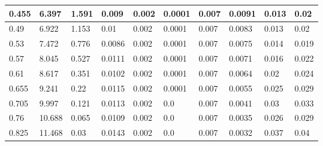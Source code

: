\begin{landscape}
\begin{table}
\begin{tabular}{|p{1cm}|p{1cm}|p{1.5cm}|p{1.5cm}|p{2cm}|p{2cm}|p{1.5cm}|p{1.5cm}|p{2.5cm}|p{2.5cm}|}
		0.455 & 6.397  & 1.591         & 0.009             & 0.002              & 0.0001               & 0.007              & 0.0091                & 0.013             & 0.02                \\ \hline
		0.49  & 6.922  & 1.153         & 0.01              & 0.002              & 0.0001               & 0.007              & 0.0083                & 0.013             & 0.02                \\ \hline
		0.53  & 7.472  & 0.776         & 0.0086            & 0.002              & 0.0001               & 0.007              & 0.0075                & 0.014             & 0.019               \\ \hline
		0.57  & 8.045  & 0.527         & 0.0111            & 0.002              & 0.0001               & 0.007              & 0.0071                & 0.016             & 0.022               \\ \hline
		0.61  & 8.617  & 0.351         & 0.0102            & 0.002              & 0.0001               & 0.007              & 0.0064                & 0.02              & 0.024               \\ \hline
		0.655 & 9.241  & 0.22          & 0.0115            & 0.002              & 0.0001               & 0.007              & 0.0055                & 0.025             & 0.029               \\ \hline
		0.705 & 9.997  & 0.121         & 0.0113            & 0.002              & 0.0                  & 0.007              & 0.0041                & 0.03              & 0.033               \\ \hline
		0.76  & 10.688 & 0.065         & 0.0109            & 0.002              & 0.0                  & 0.007              & 0.0035                & 0.026             & 0.029               \\ \hline
		0.825 & 11.468 & 0.03          & 0.0143            & 0.002              & 0.0                  & 0.007              & 0.0032                & 0.037             & 0.04                \\ \hline
	\end{tabular}
\end{table}
\end{landscape}
\restoregeometry
\pagestyle{plain}

